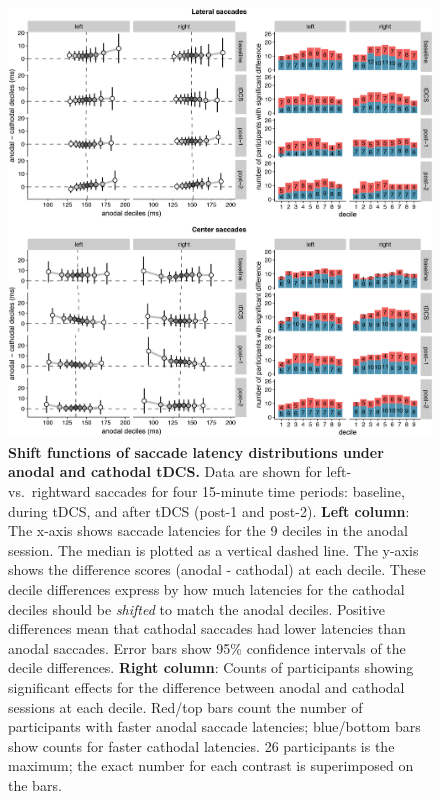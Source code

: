 \documentclass[11pt,english,]{memoir}
\begin{document}
\begin{figure}
\includegraphics[width=130mm]{sacc_tDCS_files/figures/figure_5_quantiles} \caption{\textbf{Shift functions of saccade latency distributions under anodal and cathodal tDCS.} Data are shown for left- vs.~rightward saccades for four 15-minute time periods: baseline, during tDCS, and after tDCS (post-1 and post-2). \textbf{Left column}: The x-axis shows saccade latencies for the 9 deciles in the anodal session. The median is plotted as a vertical dashed line. The y-axis shows the difference scores (anodal - cathodal) at each decile. These decile differences express by how much latencies for the cathodal deciles should be \emph{shifted} to match the anodal deciles. Positive differences mean that cathodal saccades had lower latencies than anodal saccades. Error bars show 95\% confidence intervals of the decile differences. \textbf{Right column}: Counts of participants showing significant effects for the difference between anodal and cathodal sessions at each decile. Red/top bars count the number of participants with faster anodal saccade latencies; blue/bottom bars show counts for faster cathodal latencies. 26 participants is the maximum; the exact number for each contrast is superimposed on the bars.}\label{fig:quantiles}
\end{figure}
\end{document}
